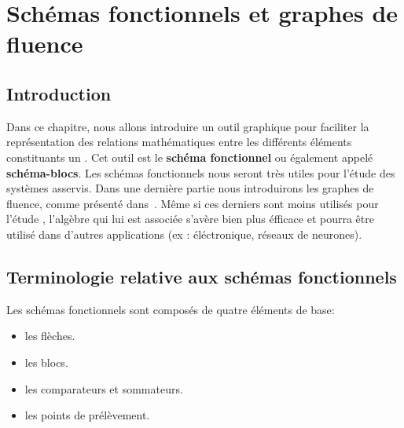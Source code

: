 \chapter[Schéma fonctionnels]{Schémas fonctionnels et graphes de fluence\label{chap-schemabloc}}

\section{Introduction}
Dans ce chapitre, nous allons introduire un outil graphique pour faciliter 
la représentation des relations mathématiques entre les différents 
éléments constituants un \SLCI. Cet outil est le \textbf{schéma fonctionnel} ou 
également appelé \textbf{schéma-blocs}. Les schémas fonctionnels nous seront très 
utiles pour l'étude des systèmes asservis. Dans une dernière partie nous introduirons 
les graphes de fluence, comme présenté dans~\cite{Ostertag}. Même si ces derniers 
sont moins utilisés pour l'étude \SLCI, l'algèbre qui lui est 
associée s'avère bien plus éfficace et pourra être utilisé dans d'autres 
applications (ex : éléctronique, réseaux de neurones).


\section{Terminologie relative aux schémas fonctionnels}
Les schémas fonctionnels sont composés de quatre éléments de base:
\begin{itemize}
    \item les flèches.
    \item les blocs.
    \item les comparateurs et sommateurs.
    \item les points de prélèvement.
\end{itemize}

\newpage
